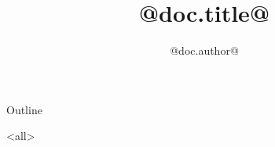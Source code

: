 \documentclass[t,11pt]{beamer}
\title{@doc.title@}
\author{@doc.author@}
\date{}
\begin{document}
\mode*
\begin{frame}{}
\titlepage
\end{frame}


\begin{frame}{Outline}
\tableofcontents
\end{frame}

\mode<all>

\end{document}
